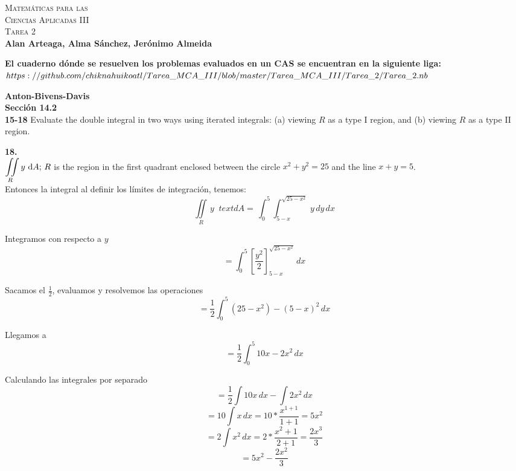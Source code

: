 \documentclass[11pt]{report}
\begin{document}
\newcommand{\BP}[1]{\bigg( #1 \bigg)} %
\newcommand{\Bp}[1]{\Big( #1 \Big)} %
\newcommand{\bp}[1]{\big( #1 \big)} %
\newcommand*\Eval[3]{\left.#1\right\rvert_{#2}^{#3}} %

\newcommand{\tsint}[1]{\int_0^{#1}} %

\begin{center}
		\textsc{\huge Matemáticas para las \\Ciencias Aplicadas III \\ Tarea 2\\}
		\textbf{Alan Arteaga, Alma Sánchez, Jerónimo Almeida}
\end{center}

\textbf{El cuaderno dónde se resuelven los problemas evaluados en un CAS se encuentran
		en la siguiente liga:\\
		$https://github.com/chiknahuikoatl/Tarea\_MCA\_III\\
		/blob/master/Tarea\_MCA\_III/Tarea\_2/Tarea\_2.nb$}

\textbf{Anton-Bivens-Davis} \\

\textbf{Sección 14.2} \\
\textbf{15-18} Evaluate the double integral in two ways using iterated integrals:
(a) viewing $R$ as a type I region, and (b) viewing $R$ as a type II region.

\textbf{18.} \\

$ {\displaystyle \iint \limits_R } \, y \, \, \text dA; \, R$ is the region in the first
quadrant enclosed between the circle $x^2 + y^2 = 25$ and the line $x + y = 5$. \\
Entonces la integral al definir los límites de integración, tenemos:
$${\displaystyle \iint \limits_R } \, y \, \, \ text dA = \, \int_{0}^{5} \int_{5-x}^{\sqrt{25 - x^2}} \, y\,dy\,dx$$

Integramos con respecto a $y$
$$ = \int_{0}^{5} \left[ \frac{y^2}{2} \right]_{5-x}^{\sqrt{25 - x^2}} \, dx$$

Sacamos el $\frac{1}{2}$, evaluamos y resolvemos las operaciones
$$ = \frac{1}{2} \int_{0}^{5} \left(25-x^2\right) - \left(5-x\right)^2 \, dx$$

Llegamos a
$$ = \frac{1}{2} \int_{0}^{5} 10x - 2x^2 \, dx$$


Calculando las integrales por separado
$$ = \frac{1}{2} \int 10x\, dx - \int 2x^2\,dx$$
$$ = 10 \int x\,dx = 10 * \frac{x^{1+1}}{1+1} = 5x^2$$
$$ = 2 \int x^2 \, dx = 2 * \frac{x^2+1}{2+1} = \frac{2x^3}{3}$$
$$ =  5x^2 - \frac{2x^2}{3}$$
\end{document}
